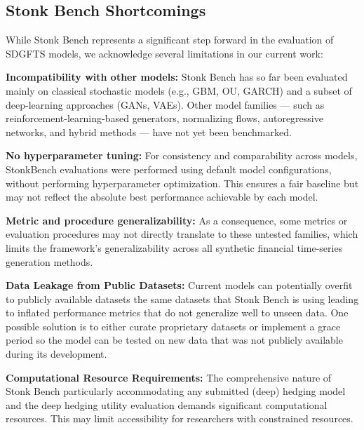   \subsection{Stonk Bench Shortcomings}\label{subsub:shortcomings}
      While Stonk Bench represents a significant step forward in the
      evaluation of SDGFTS models, we acknowledge several limitations
      in our current work:
    \begin{enumerate}[label=\textbf{[S\arabic*]}]
      \item \textbf{Incompatibility with other models:}
        Stonk Bench has so far been evaluated mainly on classical
        stochastic models (e.g., GBM, OU, GARCH) and a subset of
        deep-learning approaches (GANs, VAEs).
        Other model families — such as
        reinforcement-learning-based generators, normalizing flows,
        autoregressive networks, and hybrid methods — have not yet
        been benchmarked.
      \item \textbf{No hyperparameter tuning:} For consistency and
        comparability across models, StonkBench evaluations were
        performed using default model configurations, without
        performing hyperparameter optimization. This ensures a fair
        baseline but may not reflect the absolute best performance
        achievable by each model.
      \item \textbf{Metric and procedure generalizability:}
        As a consequence, some metrics or evaluation procedures may
        not directly translate to these untested families, which
        limits the framework's generalizability across all synthetic
        financial time-series generation methods.
      \item \textbf{Data Leakage from Public Datasets:} Current models
        can potentially overfit to publicly available datasets
        \textemdash the same datasets that Stonk Bench is using
        \textemdash leading to inflated performance metrics that do
        not generalize well to unseen data. One possible solution is
        to either curate proprietary datasets or implement a grace
        period so the model can be tested on new data that was not
        publicly available during its development.
      \item \textbf{Computational Resource Requirements:} The
        comprehensive nature of Stonk Bench \textemdash particularly
        accommodating any submitted (deep) hedging model and the deep
        hedging utility evaluation \textemdash demands significant
        computational resources. This may limit accessibility for
        researchers with constrained resources.
    \end{enumerate}
